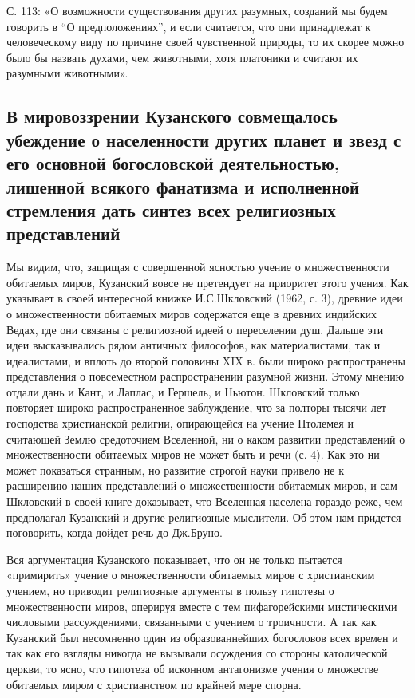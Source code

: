 С. 113: «О возможности существования других разумных, созданий мы
будем говорить в ``О предположениях'', и если считается, что они
принадлежат к человеческому виду по причине своей чувственной природы,
то их скорее можно было бы назвать духами, чем животными, хотя
платоники и считают их разумными животными».

\subsection{В мировоззрении Кузанского совмещалось убеждение о
населенности других планет и звезд с его основной богословской
деятельностью, лишенной всякого фанатизма и исполненной
стремления дать синтез всех религиозных представлений}

Мы видим, что, защищая с совершенной ясностью учение о множественности
обитаемых миров, Кузанский вовсе не претендует на приоритет этого
учения. Как указывает в своей интересной книжке И.С.Шкловский (1962,
с. 3), древние идеи о множественности обитаемых миров содержатся еще в
древних индийских Ведах, где они связаны с религиозной идеей о
переселении душ. Дальше эти идеи высказывались рядом античных
философов, как материалистами, так и идеалистами, и вплоть до второй
половины XIX в. были широко распространены представления о
повсеместном распространении разумной жизни. Этому мнению отдали дань
и Кант, и Лаплас, и Гершель, и Ньютон. Шкловский только повторяет
широко распространенное заблуждение, что за полторы тысячи лет
господства христианской религии, опирающейся на учение Птолемея и
считающей Землю средоточием Вселенной, ни о каком развитии
представлений о множественности обитаемых миров не может быть и речи
(с. 4). Как это ни может показаться странным, но развитие строгой
науки привело не к расширению наших представлений о множественности
обитаемых миров, и сам Шкловский в своей книге доказывает, что
Вселенная населена гораздо реже, чем предполагал Кузанский и другие
религиозные мыслители. Об этом нам придется поговорить, когда дойдет
речь до Дж.Бруно.

Вся аргументация Кузанского показывает, что он не только пытается
«примирить» учение о множественности обитаемых миров с христианским
учением, но приводит религиозные аргументы в пользу гипотезы о
множественности миров, оперируя вместе с тем пифагорейскими
мистическими числовыми рассуждениями, связанными с учением о
троичности. А так как Кузанский был несомненно один из образованнейших
богословов всех времен и так как его взгляды никогда не вызывали
осуждения со стороны католической церкви, то ясно, что гипотеза об
исконном антагонизме учения о множестве обитаемых миром с
христианством по крайней мере спорна.

